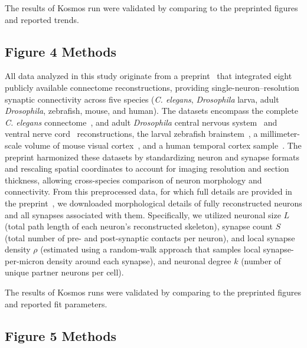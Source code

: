 \documentclass{article}
\begin{document}
The results of Kosmos run were validated by comparing to the preprinted figures and reported trends.

\subsection{Figure 4 Methods}

All data analyzed in this study originate from a preprint~\cite{piazza_physical_2025} that integrated eight publicly available connectome reconstructions, providing single-neuron--resolution synaptic connectivity across five species (\textit{C. elegans}, \textit{Drosophila} larva, adult \textit{Drosophila}, zebrafish, mouse, and human). The datasets encompass the complete \textit{C. elegans} connectome~\cite{white_structure_1986, winding_connectome_2023}, and adult \textit{Drosophila} central nervous system~\cite{dorkenwald_neuronal_2024, scheffer_connectome_2020} and ventral nerve cord~\cite{takemura_connectome_2024} reconstructions, the larval zebrafish brainstem~\cite{vishwanathan_predicting_2024}, a millimeter-scale volume of mouse visual cortex~\cite{schneider-mizell_inhibitory_2025}, and a human temporal cortex sample~\cite{shapson-coe_petavoxel_2024}. The preprint harmonized these datasets by standardizing neuron and synapse formats and rescaling spatial coordinates to account for imaging resolution and section thickness, allowing cross-species comparison of neuron morphology and connectivity. From this preprocessed data, for which full details are provided in the preprint~\cite{piazza_physical_2025}, we downloaded morphological details of fully reconstructed neurons and all synapses associated with them. Specifically, we utilized neuronal size $L$ (total path length of each neuron’s reconstructed skeleton), synapse count $S$ (total number of pre- and post-synaptic contacts per neuron), and local synapse density $\rho$ (estimated using a random-walk approach that samples local synapse-per-micron density around each synapse), and neuronal degree $k$ (number of unique partner neurons per cell).

The results of Kosmos runs were validated by comparing to the preprinted figures and reported fit parameters.

\subsection{Figure 5 Methods}
\end{document}
